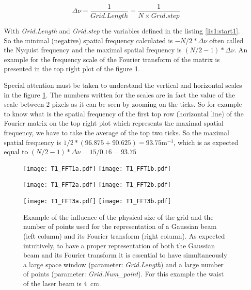 \begin{equation}
 \Delta \nu = \frac{1}{Grid.Length} =\frac{1}{N \times Grid.step}
\end{equation}

With \emph{Grid.Length} and \emph{Grid.step} the variables defined in the listing \ref{lis1:start1}. So the minimal (negative) spatial frequency calculated is $- N/2 *\Delta \nu$ often called the Nyquist frequency and the maximal spatial frequency is $(N/2-1) *\Delta \nu$. An example for the frequency scale of the Fourier transform of the matrix is presented in the top right plot of the figure \ref{fig1:FFT}.

Special attention must be taken to understand the vertical and horizontal scales in the figure \ref{fig1:FFT}. The numbers written for the scales are in fact the value of the scale between 2 pixels as it can be seen by zooming on the ticks. So for example to know what is the spatial frequency of the first top row (horizontal line) of the Fourier matrix on the top right plot which represents the maximal spatial frequency, we have to take the average of the top two ticks. So the maximal spatial frequency is $1/2*(96.875 + 90.625) = 93.75 \textrm{m}^{-1}$, which is as expected equal to $(N/2-1) *\Delta \nu = 15/0.16 = 93.75 $\\



\begin{figure}
\begin{center}
\texttt{[image: T1\_FFT1a.pdf]}\hfill
\texttt{[image: T1\_FFT1b.pdf]}

\texttt{[image: T1\_FFT2a.pdf]}\hfill
\texttt{[image: T1\_FFT2b.pdf]}

\texttt{[image: T1\_FFT3a.pdf]}\hfill
\texttt{[image: T1\_FFT3b.pdf]}

\end{center}
\vspace*{-0.8cm}
\caption{\label{fig1:FFT} Example of the influence of the physical size of the grid and the number of points used for the representation of a Gaussian beam (left column) and its Fourier transform (right column). As expected intuitively, to have a proper representation of both the Gaussian beam and its Fourier transform it is essential to have simultaneously a large space window (parameter: \textsl{Grid.Length}) and a large number of points (parameter: \textsl{Grid.Num\_point}). For this example the waist of the laser beam is 4~cm. }
\end{figure}

